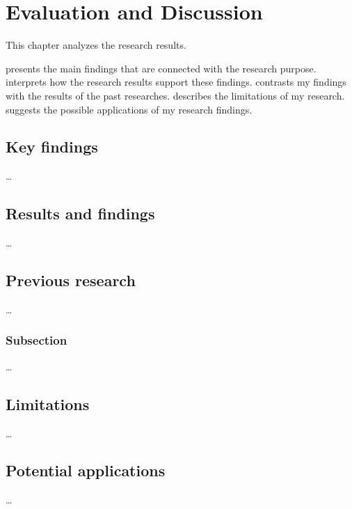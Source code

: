 \chapter{Evaluation and Discussion}
\label{chap:EvaluationDiscussion}

This chapter analyzes the research results.

 presents the main findings that are connected with the research purpose.
 interprets how the research results support these findings.
 contrasts my findings with the results of the past researches.
 describes the limitations of my research.
 suggests the possible applications of my research findings.

\section{Key findings}
\label{chap:EvaluationDiscussion:KeyFindings}

\dots

\section{Results and findings}
\label{chap:EvaluationDiscussion:ResultsFindings}

\dots

\section{Previous research}
\label{chap:EvaluationDiscussion:PreviousResearch}

\dots

\subsection{Subsection}
\label{chap:EvaluationDiscussion:PreviousResearch:Subsection}

\dots

\section{Limitations}
\label{chap:EvaluationDiscussion:Limitations}

\dots

\section{Potential applications}
\label{chap:EvaluationDiscussion:PotentialApplications}

\dots